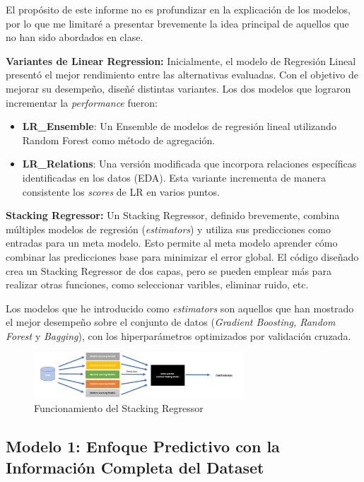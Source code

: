 \documentclass{article}
\begin{document}
El propósito de este informe no es profundizar en la explicación de los modelos, por lo que me limitaré a presentar brevemente la idea principal de aquellos que no han sido abordados en clase.

\textbf{Variantes de Linear Regression:} Inicialmente, el modelo de Regresión Lineal presentó el mejor rendimiento entre las alternativas evaluadas. Con el objetivo de mejorar su desempeño, diseñé distintas variantes. Los dos modelos que lograron incrementar la \textit{performance} fueron: 


\begin{itemize}
  \item \textbf{LR\_Ensemble}: Un Ensemble de modelos de regresión lineal utilizando Random Forest como método de agregación.
  \item \textbf{LR\_Relations}: Una versión modificada que incorpora relaciones específicas identificadas en los datos (EDA). Esta variante incrementa de manera consistente los \textit{scores} de LR en varios puntos.
\end{itemize}

\textbf{Stacking Regressor:} 
Un Stacking Regressor, definido brevemente, combina múltiples modelos de regresión (\textit{estimators}) y utiliza sus predicciones como entradas para un meta modelo. 
Esto permite al meta modelo aprender cómo combinar las predicciones base para minimizar el error global.
El código diseñado crea un Stacking Regressor de dos capas, pero se pueden emplear más para realizar otras funciones, como seleccionar varibles, eliminar ruido, etc.

Los modelos que he introducido como \textit{estimators} son aquellos que han mostrado el mejor desempeño sobre el conjunto de datos (\textit{Gradient Boosting, Random Forest} y \textit{Bagging}), con los hiperparámetros optimizados por validación cruzada.

\begin{figure}[ht]
  \centering
  \includegraphics[width=0.7\textwidth]{Stack_Explanation.png}
  \caption{Funcionamiento del Stacking Regressor}
\end{figure}

\subsection{Modelo 1: Enfoque Predictivo con la Información Completa del Dataset}
\end{document}

